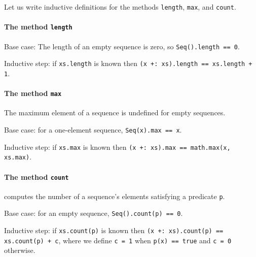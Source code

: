 Let us write inductive definitions for the methods \lstinline!length!,
\lstinline!max!, and \lstinline!count!.

\paragraph{The method \texttt{length}}

Base case: The length of an empty sequence is zero, so \lstinline!Seq().length == 0!. 

Inductive step: if \lstinline!xs.length! is known then \lstinline!(x +: xs).length == xs.length + 1!.

\paragraph{The method \texttt{max}}

The maximum element of a sequence is undefined for empty sequences. 

Base case: for a one-element sequence, \lstinline!Seq(x).max == x!. 

Inductive step: if \lstinline!xs.max! is known then \lstinline!(x +: xs).max == math.max(x, xs.max)!.

\paragraph{The method \texttt{count}}

computes the number of a sequence\textsf{'}s elements satisfying a predicate
\lstinline!p!. 

Base case: for an empty sequence, \lstinline!Seq().count(p) == 0!. 

Inductive step: if \lstinline!xs.count(p)! is known then \lstinline!(x +: xs).count(p) == xs.count(p) + c!,
where we define \lstinline!c = 1! when \lstinline!p(x) == true!
and \lstinline!c = 0! otherwise.

